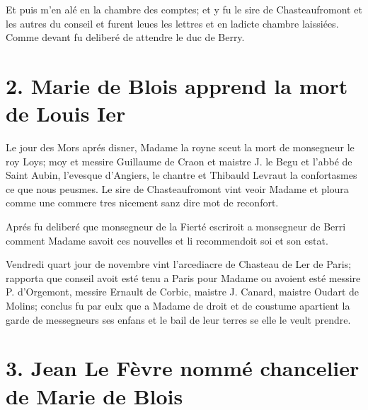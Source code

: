 \documentclass[]{book}
\begin{document}
                Et puis m'en alé en la chambre des comptes; et y fu le sire de Chasteaufromont et les autres du conseil et furent leues les lettres et en ladicte chambre laissiées. Comme devant fu deliberé de attendre le duc de Berry.
                    
                
            \chapter*{2. Marie de Blois apprend la mort de Louis Ier}
            
            
            Le jour des Mors aprés disner, Madame la royne sceut la mort de monsegneur le roy Loys; moy et messire Guillaume de Craon et maistre J. le Begu et l'abbé de Saint Aubin, l'evesque d'Angiers, le chantre et Thibauld Levraut la confortasmes ce que nous peusmes. Le sire de Chasteaufromont vint veoir Madame et ploura comme une commere tres nicement sanz dire mot de reconfort.
                    
                Aprés fu deliberé que monsegneur de la Fierté escriroit a monsegneur de Berri comment Madame savoit ces nouvelles et li recommendoit soi et son estat.
                    
                Vendredi quart jour de novembre vint l'arcediacre de Chasteau de Ler de Paris; rapporta que conseil avoit esté tenu a Paris pour Madame ou avoient esté messire P. d'Orgemont, messire Ernault de Corbic, maistre J. Canard, maistre Oudart de Molins; conclus fu par eulx que a Madame de droit et de coustume apartient la garde de messegneurs ses enfans et le bail de leur terres se elle le veult prendre.
                    
                
            \chapter*{3. Jean Le Fèvre nommé chancelier de Marie de Blois}
            
\end{document}
